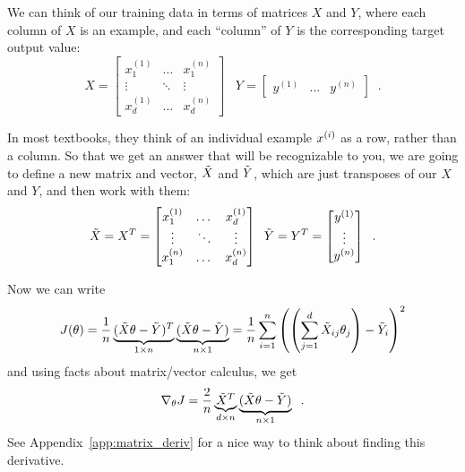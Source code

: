 We can think of our training data in terms of matrices $X$ and $Y$,
where each column of $X$ is an example, and each ``column'' of $Y$ is
the corresponding target output value:
\begin{equation*}
  X = \begin{bmatrix}x_1^{(1)} & \dots & x_1^{(n)} \\\vdots & \ddots &
               \vdots                        \\x_d^{(1)} & \dots & x_d^{(n)}\end{bmatrix} \;\;\;
  Y = \begin{bmatrix}y^{(1)} & \dots & y^{(n)}\end{bmatrix}\;\;.
\end{equation*}


In most textbooks, they think of an individual example $x^{(i)}$ as
a row, rather than a column.  So that we get an answer that will be
recognizable to you, we are going to define a new matrix and vector,
$\tilde{X}$ and $\tilde{Y}$, which are just transposes of our $X$ and $Y$, and
then work with them:
$$ \tilde{X} = X^T = \begin{bmatrix}x_1^{(1)} & \dots & x_d^{(1)}\\\vdots & \ddots & \vdots\\x_1^{(n)} & \dots & x_d^{(n)}\end{bmatrix} \;\;
  \tilde{Y} = Y^T = \begin{bmatrix}y^{(1)}\\\vdots\\y^{(n)}\end{bmatrix} \;\;.$$

Now we can write
\[ J(\theta) = \frac{1}{n}\underbrace{(\tilde{X}\theta - \tilde{Y})^T}_{1 \times
    n}\underbrace{(\tilde{X}\theta - \tilde{Y})}_{n \times 1} =
  \frac{1}{n}\sum_{i=1}^n \left(\left(\sum_{j=1}^d \tilde{X}_{ij}\theta_j
    \right) - \tilde{Y}_i\right)^2\]
and using facts about matrix/vector calculus, we get 
\begin{equation}
  \nabla_{\theta}J = \frac{2}{n}\underbrace{\tilde{X}^T}_{d \times n}\underbrace{(\tilde{X}\theta - \tilde{Y})}_{n \times 1}\;\;.
\end{equation}
See Appendix~\ref{app:matrix_deriv} for a nice way to think about finding this
derivative.

